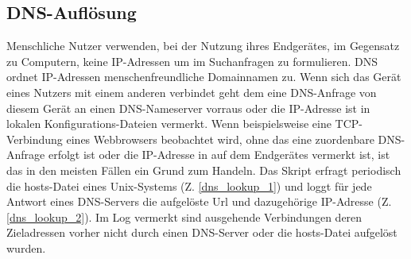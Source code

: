 \subsection{DNS-Auflösung}
Menschliche Nutzer verwenden, bei der Nutzung ihres Endgerätes, im Gegensatz zu Computern, keine IP-Adressen um im Suchanfragen zu formulieren. DNS ordnet IP-Adressen menschenfreundliche Domainnamen zu. Wenn sich das Gerät eines Nutzers mit einem anderen verbindet geht dem eine DNS-Anfrage von diesem Gerät an einen DNS-Nameserver vorraus oder die IP-Adresse ist in lokalen Konfigurations-Dateien vermerkt. Wenn beispielsweise eine TCP-Verbindung eines Webbrowsers beobachtet wird, ohne das eine zuordenbare DNS-Anfrage erfolgt ist oder die IP-Adresse in auf dem Endgerätes vermerkt ist, ist das in den meisten Fällen ein Grund zum Handeln.
Das Skript erfragt periodisch die hosts-Datei eines Unix-Systems (Z. \ref{dns_lookup_1}) und loggt für jede Antwort eines DNS-Servers die aufgelöste Url und dazugehörige IP-Adresse (Z. \ref{dns_lookup_2}). Im Log vermerkt sind ausgehende Verbindungen deren Zieladressen vorher nicht durch einen DNS-Server oder die hosts-Datei aufgelöst wurden.
